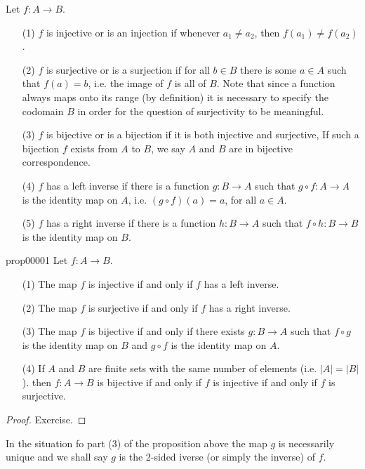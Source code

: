 \documentclass[cn,11pt,chinese]{elegantbook}
\numberwithin{equation}{section}
\begin{document}
Let $f:A \to B$.
\begin{enumerate}
\item[(1)] $f$ is injective or is an injection if whenever $a_1 \neq a_2$, then $f(a_1) \neq f(a_2)$.

\item[(2)] $f$ is surjective or is a surjection if for all $b \in B$ there is some $a \in A$ such that $f(a) = b$, i.e. the image of $f$ is all of $B$. Note that since a function always maps onto its range (by definition) it is necessary to specify the codomain $B$ in order for the question of surjectivity to be meaningful.

\item[(3)] $f$ is bijective or is a bijection if it is both injective and surjective, If such a bijection $f$ exists from $A$ to $B$, we say $A$ and $B$ are in bijective correspondence.

\item[(4)] $f$ has a left inverse if there is a function $g:B \to A$ such that $g \circ f:A \to A$ is the identity map on $A$, i.e. $(g \circ f)(a)=a$, for all $a \in A$.

\item[(5)] $f$ has a right inverse if there is a function $h:B \to A$ such that $f \circ h:B \to B$ is the identity map on $B$.
\end{enumerate}

\begin{proposition}{}{prop00001}
Let $f:A \to B$.
\begin{enumerate}
\item[(1)] The map $f$ is injective if and only if $f$ has a left inverse.
\item[(2)] The map $f$ is surjective if and only if $f$ has a right inverse.
\item[(3)] The map $f$ is bijective if and only if there exists $g:B \to A$ such that $f \circ g$ is the identity map on $B$ and $g \circ f$ is the identity map on $A$.
\item[(4)] If $A$ and $B$ are finite sets with the same number of elements (i.e. $|A|=|B|$). then $f:A \to B$ is bijective if and only if $f$ is injective if and only if $f$ is surjective.
\end{enumerate}
\end{proposition}

\begin{proof}
Exercise.
\end{proof}

In the situation fo part (3) of the proposition above the map $g$ is necessarily unique and we shall say $g$ is the 2-sided iverse (or simply the inverse) of $f$.
\end{document}
